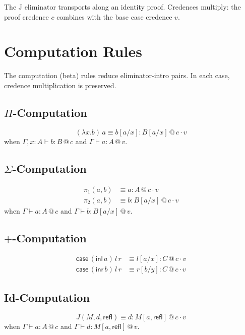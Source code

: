 \documentclass[11pt,a4paper]{article}
\makeatletter
\newcommand{\at}[1]{\,@\,#1}
\makeatother
\begin{document}
The J eliminator transports along an identity proof. Credences multiply: the proof credence $c$ combines with the base case credence $v$.

\section{Computation Rules}

The computation (beta) rules reduce eliminator-intro pairs. In each case, credence multiplication is preserved.

\subsection{$\Pi$-Computation}
\[
(\lambda x. b)\,a \equiv b[a/x] : B[a/x] \at{c \cdot v}
\]
when $\Gamma, x : A \vdash b : B \at{c}$ and $\Gamma \vdash a : A \at{v}$.

\subsection{$\Sigma$-Computation}
\begin{align}
\pi_1(a, b) &\equiv a : A \at{c \cdot v} \\
\pi_2(a, b) &\equiv b : B[a/x] \at{c \cdot v}
\end{align}
when $\Gamma \vdash a : A \at{c}$ and $\Gamma \vdash b : B[a/x] \at{v}$.

\subsection{$+$-Computation}
\begin{align}
\mathsf{case}\,(\mathsf{inl}\,a)\,l\,r &\equiv l[a/x] : C \at{c \cdot v} \\
\mathsf{case}\,(\mathsf{inr}\,b)\,l\,r &\equiv r[b/y] : C \at{c \cdot v}
\end{align}

\subsection{Id-Computation}
\[
J(M, d, \mathsf{refl}) \equiv d : M[a, \mathsf{refl}] \at{c \cdot v}
\]
when $\Gamma \vdash a : A \at{c}$ and $\Gamma \vdash d : M[a, \mathsf{refl}] \at{v}$.

\end{document}
